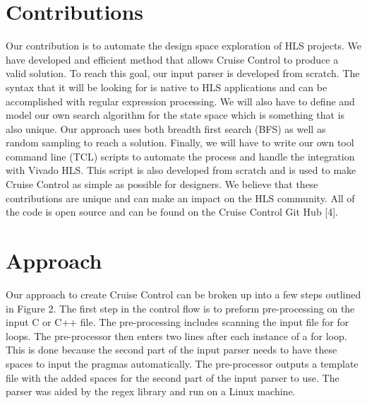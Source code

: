 \documentclass[letterpaper, 10 pt, conference]{IEEEconf}  %
\begin{document}
\section{Contributions}
Our contribution is to automate the design space exploration of HLS projects. We have developed and efficient method that allows Cruise Control to produce a valid solution. To reach this goal, our input parser is developed from scratch. The syntax that it will be looking for is native to HLS applications and can be accomplished  with regular expression processing. We will also have to define and model our own search algorithm for the state space which is something that is also unique. Our approach uses both breadth first search (BFS) as well as random sampling to reach a solution.  Finally, we will have to write our own tool command line (TCL) scripts to automate the process and handle the integration with Vivado HLS. This script is also developed from scratch and is used to make Cruise Control as simple as possible for designers. We believe that these contributions are unique and can make an impact on the HLS community. All of the code is open source and can be found on the Cruise Control Git Hub [4]. 


\section{Approach}
Our approach to create Cruise Control can be broken up into a few steps outlined in Figure 2. The first step in the control flow is to preform pre-processing on the input C or C++ file.  The pre-processing includes scanning the input file for for loops. The pre-processor then enters two lines after each instance of a for loop. This is done because the second part of the input parser needs to have these spaces to input the pragmas automatically. The pre-processor outputs a template file with the added spaces for the second part of the input parser to use. The parser was aided by the regex library and run on a Linux machine.  \newline
\end{document}
